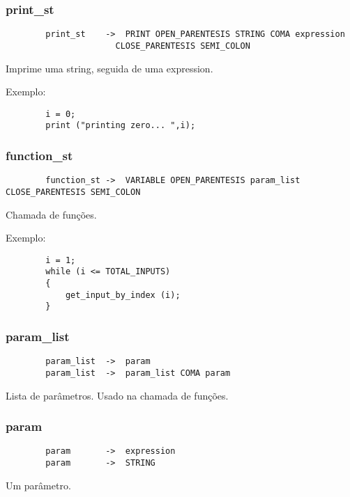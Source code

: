 \documentclass[a4paper,10pt]{article}
\begin{document}
	\subsubsection{print\_st}
		\begin{lstlisting}
		print_st	->	PRINT OPEN_PARENTESIS STRING COMA expression
					  CLOSE_PARENTESIS SEMI_COLON
		\end{lstlisting}
		Imprime uma string, seguida de uma expression.
		
		Exemplo:
		\begin{lstlisting}
		i = 0;
		print ("printing zero... ",i);
		\end{lstlisting}
		\vspace{10mm}
	\subsubsection{function\_st}
		\begin{lstlisting}
		function_st	->	VARIABLE OPEN_PARENTESIS param_list CLOSE_PARENTESIS SEMI_COLON
		\end{lstlisting}
		Chamada de fun\c{c}\~oes.
		
		Exemplo:
		\begin{lstlisting}
		i = 1;
		while (i <= TOTAL_INPUTS)
		{
		    get_input_by_index (i);
		}
		\end{lstlisting}
		\vspace{10mm}
	\subsubsection{param\_list}
		\begin{lstlisting}
		param_list	->	param
		param_list	->	param_list COMA param
		\end{lstlisting}
		Lista de par\^ametros. Usado na chamada de fun\c{c}\~oes.
		
		\vspace{10mm}
	\subsubsection{param}
		\begin{lstlisting}
		param		->	expression
		param		->	STRING
		\end{lstlisting}
		Um par\^ametro.
		
		\vspace{10mm}
\end{document}
